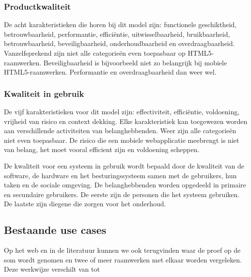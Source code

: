 \subsubsection{Productkwaliteit}
De acht karakteristieken die horen bij dit model zijn: functionele geschiktheid,  betrouwbaarheid,  performantie, efficiëntie, uitwisselbaarheid,  bruikbaarheid,  betrouwbaarheid, beveiligbaarheid,  onderhoudbaarheid en overdraagbaarheid.   
Vanzelfsprekend zijn niet alle categorieën even toepasbaar op HTML5-raamwerken.  
Beveiligbaarheid is bijvoorbeeld niet zo belangrijk bij mobiele HTML5-raamwerken.  
Performantie en overdraagbaarheid dan weer wel.

\subsubsection{Kwaliteit in gebruik}
De vijf karakteristieken voor dit model zijn: effectiviteit,  efficiëntie,  voldoening,  vrijheid van risico en context dekking. 
Elke karakteristiek kan toegewezen worden aan verschillende activiteiten van belanghebbenden. 
Weer zijn alle categorieën niet even toepasbaar.  
De risico die een mobiele webapplicatie meebrengt is niet van belang,  het moet vooral efficient zijn en voldoening scheppen.

De kwaliteit voor een systeem in gebruik wordt bepaald door de kwaliteit van de software,  de hardware en het besturingssysteem samen met de gebruikers, hun taken en de sociale omgeving.  
De belanghebbenden worden opgedeeld in primaire en secundaire gebruikers.  
De eerste zijn de personen die het systeem gebruiken. 
De laatste zijn diegene die zorgen voor het onderhoud.

\subsection{Bestaande use cases}
Op het web en in de literatuur kunnen we ook  terugvinden waar de proef op de som wordt genomen en twee of meer raamwerken met elkaar worden vergeleken.  
Deze werkwijze verschilt van  tot 

